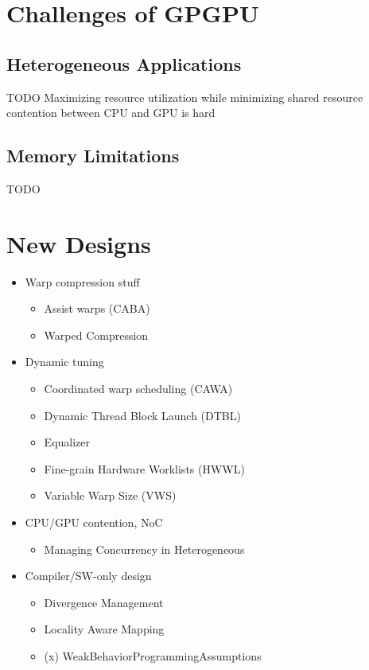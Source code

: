 \documentclass[prodmode,acmtecs]{acmsmall} %
\begin{document}
\section{Challenges of GPGPU} \label{sec:challenges}
\subsection{Heterogeneous Applications}
TODO
Maximizing resource utilization while minimizing shared resource contention between CPU and GPU is hard
\subsection{Memory Limitations}
TODO

\section{New Designs} \label{sec:research}
\begin{itemize}
\item Warp compression stuff
  \begin{itemize}
  \item Assist warps (CABA)
  \item Warped Compression
  \end{itemize}
\item Dynamic tuning
  \begin{itemize}
  \item Coordinated warp scheduling (CAWA)
  \item Dynamic Thread Block Launch (DTBL)
  \item Equalizer
  \item Fine-grain Hardware Worklists (HWWL)
  \item Variable Warp Size (VWS)
  \end{itemize}
\item CPU/GPU contention, NoC
  \begin{itemize}
  \item Managing Concurrency in Heterogeneous
  \end{itemize}
\item Compiler/SW-only design
  \begin{itemize}
  \item Divergence Management
  \item Locality Aware Mapping
  \item (x) WeakBehaviorProgrammingAssumptions
  \end{itemize}
\end{itemize}
\end{document}
